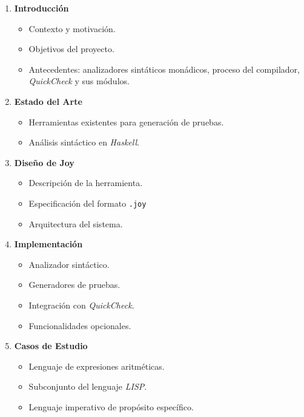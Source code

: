 \documentclass[11pt]{article}
\begin{document}
\begin{enumerate}
\item \textbf{Introducción}
  
  \begin{itemize}
  \item Contexto y motivación.
  \item Objetivos del proyecto.
  \item Antecedentes: analizadores sintáticos monádicos, proceso del compilador, \textit{QuickCheck} y sus módulos.
  \end{itemize}

\item \textbf{Estado del Arte}

  \begin{itemize}
  \item Herramientas existentes para generación de pruebas.
  \item Análisis sintáctico en \textit{Haskell}.
  \end{itemize}

\item \textbf{Diseño de Joy}

  \begin{itemize}
  \item Descripción de la herramienta.
  \item Especificación del formato \texttt{.joy}
  \item Arquitectura del sistema.
  \end{itemize}

\item \textbf{Implementación}

  \begin{itemize}
  \item Analizador sintáctico.
  \item Generadores de pruebas.
  \item Integración con \textit{QuickCheck}.
  \item Funcionalidades opcionales.
  \end{itemize}
  
\item \textbf{Casos de Estudio}

  \begin{itemize}
  \item Lenguaje de expresiones aritméticas.
  \item Subconjunto del lenguaje \textit{LISP}.
  \item Lenguaje imperativo de propósito específico.
  \end{itemize}


\end{enumerate}
\end{document}
